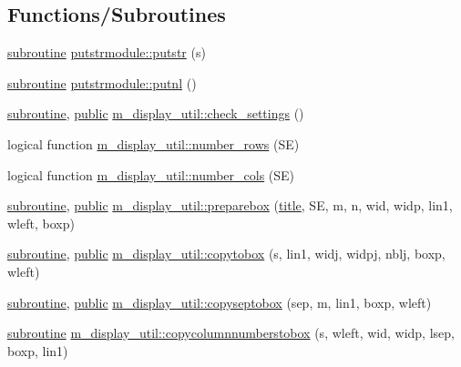 \subsection*{Functions/\+Subroutines}
\begin{DoxyCompactItemize}
\item 
\hyperlink{M__stopwatch_83_8txt_acfbcff50169d691ff02d4a123ed70482}{subroutine} \hyperlink{namespaceputstrmodule_a3557206c6eaead47ecd6a04e58f69f90}{putstrmodule\+::putstr} (s)
\item 
\hyperlink{M__stopwatch_83_8txt_acfbcff50169d691ff02d4a123ed70482}{subroutine} \hyperlink{namespaceputstrmodule_ab85a50db8f38a797bd4ecf0b00a40e85}{putstrmodule\+::putnl} ()
\item 
\hyperlink{M__stopwatch_83_8txt_acfbcff50169d691ff02d4a123ed70482}{subroutine}, \hyperlink{M__stopwatch_83_8txt_a2f74811300c361e53b430611a7d1769f}{public} \hyperlink{namespacem__display__util_ad15e85a03cd2a7ef8f405fbb9c1061af}{m\+\_\+display\+\_\+util\+::check\+\_\+settings} ()
\item 
logical function \hyperlink{namespacem__display__util_a7a886d21010f7a6f0f8101d2b26fd97d}{m\+\_\+display\+\_\+util\+::number\+\_\+rows} (SE)
\item 
logical function \hyperlink{namespacem__display__util_a837cfbf5c0d097da743220ac0acfaec8}{m\+\_\+display\+\_\+util\+::number\+\_\+cols} (SE)
\item 
\hyperlink{M__stopwatch_83_8txt_acfbcff50169d691ff02d4a123ed70482}{subroutine}, \hyperlink{M__stopwatch_83_8txt_a2f74811300c361e53b430611a7d1769f}{public} \hyperlink{namespacem__display__util_a70f3818ca97ec91537e81b9f9b10953c}{m\+\_\+display\+\_\+util\+::preparebox} (\hyperlink{print__watch_83_8txt_a15b5bd21156bb9fca6a755ab8c029a9c}{title}, SE, m, n, wid, widp, lin1, wleft, boxp)
\item 
\hyperlink{M__stopwatch_83_8txt_acfbcff50169d691ff02d4a123ed70482}{subroutine}, \hyperlink{M__stopwatch_83_8txt_a2f74811300c361e53b430611a7d1769f}{public} \hyperlink{namespacem__display__util_aca56756281a372cd4d186a032dd426fb}{m\+\_\+display\+\_\+util\+::copytobox} (s, lin1, widj, widpj, nblj, boxp, wleft)
\item 
\hyperlink{M__stopwatch_83_8txt_acfbcff50169d691ff02d4a123ed70482}{subroutine}, \hyperlink{M__stopwatch_83_8txt_a2f74811300c361e53b430611a7d1769f}{public} \hyperlink{namespacem__display__util_ab8090500f628c3475b88b0068c6788a4}{m\+\_\+display\+\_\+util\+::copyseptobox} (sep, m, lin1, boxp, wleft)
\item 
\hyperlink{M__stopwatch_83_8txt_acfbcff50169d691ff02d4a123ed70482}{subroutine} \hyperlink{namespacem__display__util_a43abab0fd2426042dc21b42e638210a8}{m\+\_\+display\+\_\+util\+::copycolumnnumberstobox} (s, wleft, wid, widp, lsep, boxp, lin1)

\end{DoxyCompactItemize}
